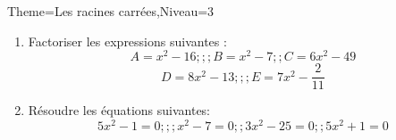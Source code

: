\documentclass[a4paper,12pt]{article}
\begin{document}
\begin{Maquette}[Fiche]{Theme=Les racines carrées,Niveau=3}
\begin{exercice}
\begin{enumerate}
\item Factoriser les expressions suivantes :
$$A=x^{2}-16 ;;; B=x^{2}-7 ;;  C=6x^{2}-49 $$
$$D=8x^{2}-13;;; E=7x^{2}-\dfrac{2}{11} $$
\item Résoudre les équations suivantes:
$$5x^{2}-1=0;;; x^{2}-7=0;; 3x^{2}-25=0;; 5x^{2}+1=0 $$
\end{enumerate}

\end{exercice}


\end{Maquette}
\end{document}
